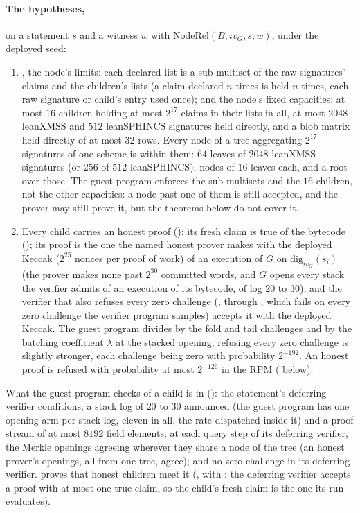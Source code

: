 \documentclass[11pt]{article}
\begin{document}
\paragraph{The hypotheses,} on a statement $s$ and a witness $w$ with
$\mathrm{NodeRel}(B, iv_G, s, w)$, under the deployed seed:
\begin{enumerate}
\item {}, the node's limits: each declared list
is a sub-multiset of the raw signatures' claims and the children's lists (a claim declared $n$ times
is held $n$ times, each raw signature or child's entry used once); and the node's fixed capacities: at most $16$ children holding at most $2^{17}$ claims in their lists in all, at most $2048$ leanXMSS and $512$ leanSPHINCS signatures held directly, and a blob matrix held directly of at most $32$ rows. Every node of a tree aggregating $2^{17}$ signatures of one scheme is within them: $64$ leaves of $2048$ leanXMSS signatures (or $256$ of $512$ leanSPHINCS), nodes of $16$ leaves each, and a root over those. The guest program enforces the sub-multisets and the $16$ children, not the other capacities: a node past one of them is still accepted, and the prover may still prove it, but the theorems below do not cover it.
\item Every child carries an honest proof (): its fresh claim is true of the
bytecode (); its proof is the one the named honest prover
 makes with the deployed Keccak
($2^{25}$ nonces per proof of work) of an execution of $G$ on $\mathrm{dig}_{iv_G}(s_i)$ (the
prover makes none past $2^{30}$ committed words, and $G$ opens every stack the verifier admits of an
execution of its bytecode, of log $20$ to $30$); and the verifier that also refuses
every zero challenge (, through
, which fails on every zero challenge the verifier
program samples) accepts it with the deployed Keccak. The guest program divides by the fold and tail
challenges and by the batching coefficient $\lambda$ at the stacked opening; refusing every zero
challenge is slightly stronger, each challenge being zero with probability $2^{-192}$. An honest
proof is refused with probability at most $2^{-126}$ in the RPM (
below).
\end{enumerate}
What the guest program checks of a child is in  (): the
statement's deferring-verifier conditions; a stack log of $20$ to $30$ announced (the guest program
has one opening arm per stack log, eleven in all, the rate dispatched inside it) and a proof stream of at most $8192$ field
elements; at each query step of its deferring verifier, the Merkle openings agreeing wherever they
share a node of the tree (an honest prover's openings, all from one tree, agree); and no zero
challenge in its deferring verifier.  proves that honest children meet it
(, with : the deferring verifier accepts a proof
with at most one true claim, so the child's fresh claim is the one its run evaluates).
\end{document}
